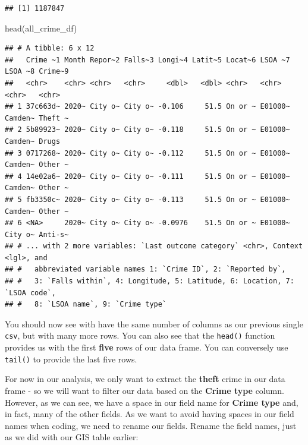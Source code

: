 \documentclass[
]{book}
\newenvironment{Shaded}{\begin{snugshade}}{\end{snugshade}}
\newcommand{\FunctionTok}[1]{\textcolor[rgb]{0.00,0.00,0.00}{#1}}
\newcommand{\NormalTok}[1]{#1}
\begin{document}
\begin{verbatim}
## [1] 1187847
\end{verbatim}

\begin{Shaded}
\begin{Highlighting}[]
\FunctionTok{head}\NormalTok{(all\_crime\_df)}
\end{Highlighting}
\end{Shaded}

\begin{verbatim}
## # A tibble: 6 x 12
##   Crime ~1 Month Repor~2 Falls~3 Longi~4 Latit~5 Locat~6 LSOA ~7 LSOA ~8 Crime~9
##   <chr>    <chr> <chr>   <chr>     <dbl>   <dbl> <chr>   <chr>   <chr>   <chr>  
## 1 37c663d~ 2020~ City o~ City o~ -0.106     51.5 On or ~ E01000~ Camden~ Theft ~
## 2 5b89923~ 2020~ City o~ City o~ -0.118     51.5 On or ~ E01000~ Camden~ Drugs  
## 3 0717268~ 2020~ City o~ City o~ -0.112     51.5 On or ~ E01000~ Camden~ Other ~
## 4 14e02a6~ 2020~ City o~ City o~ -0.111     51.5 On or ~ E01000~ Camden~ Other ~
## 5 fb3350c~ 2020~ City o~ City o~ -0.113     51.5 On or ~ E01000~ Camden~ Other ~
## 6 <NA>     2020~ City o~ City o~ -0.0976    51.5 On or ~ E01000~ City o~ Anti-s~
## # ... with 2 more variables: `Last outcome category` <chr>, Context <lgl>, and
## #   abbreviated variable names 1: `Crime ID`, 2: `Reported by`,
## #   3: `Falls within`, 4: Longitude, 5: Latitude, 6: Location, 7: `LSOA code`,
## #   8: `LSOA name`, 9: `Crime type`
\end{verbatim}

You should now see with have the same number of columns as our previous single \texttt{csv}, but with many more rows. You can also see that the \texttt{head()} function provides us with the first \textbf{five} rows of our data frame. You can conversely use \texttt{tail()} to provide the last five rows.

For now in our analysis, we only want to extract the \textbf{theft} crime in our data frame - so we will want to filter our data based on the \textbf{Crime type} column. However, as we can see, we have a space in our field name for \textbf{Crime type} and, in fact, many of the other fields. As we want to avoid having spaces in our field names when coding, we need to rename our fields. Rename the field names, just as we did with our GIS table earlier:
\end{document}
